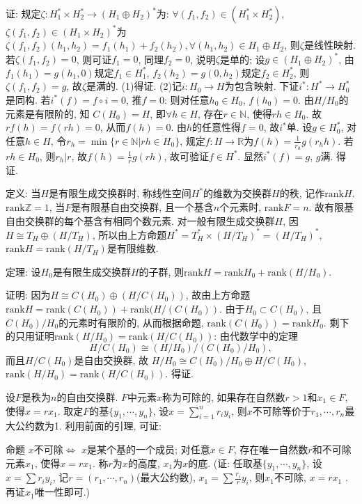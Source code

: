 \documentclass{ctexart}%
\theoremstyle{definition}
\theoremstyle{remark}
\begin{document}
证: 规定$\zeta: H^*_1\times H^*_2\rightarrow (H_1\oplus H_2)^*$为: $\forall (f_1,f_2)\in (H^*_1\times H^*_2)$, $\zeta(f_1,f_2)\in (H_1\times H_2)^*$为$\zeta(f_1,f_2)(h_1,h_2)=f_1(h_1)+f_2(h_2), \forall(h_1,h_2)\in H_1\oplus H_2$, 则$\zeta$是线性映射. 若$\zeta(f_1,f_2)=0$, 则可证$f_1=0$, 同理$f_2=0$, 说明$\zeta$是单的; 设$g\in (H_1\oplus H_2)^*$, 由$f_1(h_1)=g(h_1,0)$规定$f_1\in H^*_1$, $f_2(h_2)=g(0,h_2)$规定$f_2\in H^*_2$, 则$\zeta(f_1,f_2)=g$, 故$\zeta$是满的. (1)得证. (2)记$i: H_0\rightarrow H$为包含映射. 下证$i^*:H^*\rightarrow H^*_0$是同构. 若$i^*(f)=f\circ i=0$, 推$f=0$: 则对任意$h_0\in H_0$, $f(h_0)=0$. 由$H/H_0$的元素是有限阶的, 知 $C(H_0)=H$, 即$\forall h\in H$, 存在$r\in \mathbb{N}$, 使得$rh\in H_0$. 故$rf(h)=f(rh)=0$, 从而$f(h)=0$. 由$h$的任意性得$f=0$, 故$i^*$单. 设$g\in H^*_0$, 对任意$h\in H$, 令$r_h=\min\{r \in \mathbb{N}|rh\in H_0\}$, 规定$f: H\rightarrow \mathbb{R}$为$f(h) = \frac{1}{r_h}g(r_h h)$. 若$rh\in H_0$, 则$r_h|r$, 故$f(h)=\frac{1}{r} g(rh)$, 故可验证$f\in H^*$. 显然$i^*(f)=g$, $g$满. 得证.

定义: 当$H$是有限生成交换群时, 称线性空间$H^*$的维数为交换群$H$的秩, 记作$\text{rank}H$.$\text{rank}\mathbb{Z}=1$, 当$F$是有限基自由交换群, 且一个基含$n$个元素时, $\text{rank}F=n$. 故有限基自由交换群的每个基含有相同个数元素. 对一般有限生成交换群$H$, 因$H\cong T_H\oplus (H/T_H)$, 所以由上方命题$H^*=T^*_H\times (H/T_H)^*=(H/T_H)^*$, $\text{rank}H=\text{rank}(H/T_H)$是有限维数. 

定理: 设$H_0$是有限生成交换群$H$的子群, 则$\text{rank}H=\text{rank}H_0+\text{rank}(H/H_0)$. 

证明: 因为$H\cong C(H_0)\oplus (H/C(H_0))$, 故由上方命题$\text{rank}H=\text{rank}(C(H_0))+\text{rank}(H/(C(H_0))$. 由于$H_0\subset C(H_0)$, 且$C(H_0)/H_0$的元素时有限阶的, 从而根据命题, $\text{rank}(C(H_0))=\text{rank} H_0$. 剩下的只用证明$\text{rank}(H/H_0)= \text{rank}(H/C(H_0))$: 由代数学中的定理
$$H/C(H_0)\cong (H/H_0)/(C(H_0)/H_0),$$
而且$H/C(H_0)$是自由交换群, 故
$H/H_0 \cong C(H_0)/H_0\oplus H/C(H_0)$, $\text{rank}(H/H_0)=\text{rank}(H/C(H_0))$. 得证. 

设$F$是秩为$n$的自由交换群. $F$中元素$x$称为可除的, 如果存在自然数$r>1$和$x_1\in F$, 使得$x=rx_1$. 取定$F$的基$\{y_1,\cdots, y_n\}$, 设$x= \sum_{i=1}^n r_iy_i$, 则$x$不可除等价于$r_1,\cdots,r_n$最大公约数为1. 利用前面的引理, 可证:

命题 $x$不可除$\Longleftrightarrow$ $x$是某个基的一个成员; 对任意$x\in F$, 存在唯一自然数$r$和不可除元素$x_1$, 使得$x=rx_1$. 称$r$为$x$的高度, $x_1$为$x$的底. (证: 任取基$\{y_1,\cdots,y_n\}$, 设$x= \sum r_iy_i$, 记$r=(r_1,\cdots,r_n)$(最大公约数), $x_1 =\sum \frac{r_i}{r}y_i$, 则$x_1$不可除, $x=r x_1$ . 再证$x_1$唯一性即可.)
\end{document}
